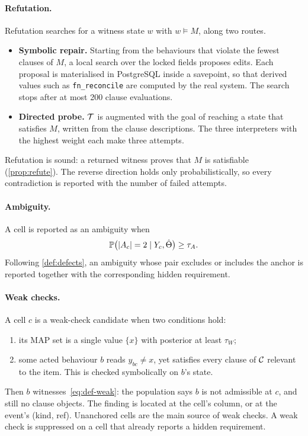 \paragraph{Refutation.} Refutation searches for a witness state $w$ with $w\models M$, along two routes.
\begin{itemize}[leftmargin=*]
\item \textbf{Symbolic repair.} Starting from the behaviours that violate the fewest clauses of $M$, a local search over the locked fields proposes edits. Each proposal is materialised in PostgreSQL inside a savepoint, so that derived values such as \texttt{fn\_reconcile} are computed by the real system. The search stops after at most 200 clause evaluations.
\item \textbf{Directed probe.} $\mathcal{T}$ is augmented with the goal of reaching a state that satisfies $M$, written from the clause descriptions. The three interpreters with the highest weight each make three attempts.
\end{itemize}
Refutation is sound: a returned witness proves that $M$ is satisfiable (\cref{prop:refute}). The reverse direction holds only probabilistically, so every contradiction is reported with the number of failed attempts.

\paragraph{Ambiguity.} A cell is reported as an ambiguity when
\begin{equation}
\label{eq:amb}
\mathbb{P}\bigl(|A_c|=2\mid Y_c,\hat\Theta\bigr)\ge\tau_A .
\end{equation}
Following \cref{def:defects}, an ambiguity whose pair excludes or includes the anchor is reported together with the corresponding hidden requirement.

\paragraph{Weak checks.} A cell $c$ is a weak-check candidate when two conditions hold:
\begin{enumerate}[leftmargin=*,label=(\roman*)]
\item its MAP set is a single value $\{x\}$ with posterior at least $\tau_W$;
\item some acted behaviour $b$ reads $y_{bc}\neq x$, yet satisfies every clause of $\mathcal{C}$ relevant to the item. This is checked symbolically on $b$'s state.
\end{enumerate}
Then $b$ witnesses~\eqref{eq:def-weak}: the population says $b$ is not admissible at $c$, and still no clause objects. The finding is located at the cell's column, or at the event's (kind, ref). Unanchored cells are the main source of weak checks. A weak check is suppressed on a cell that already reports a hidden requirement.

